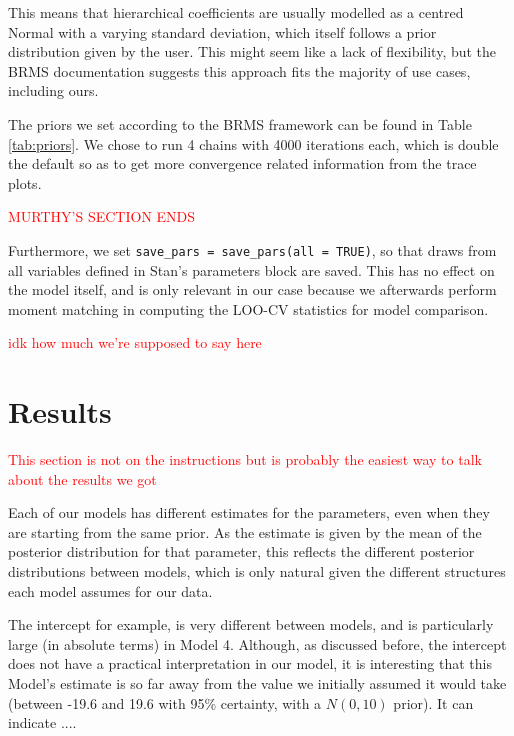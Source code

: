 \documentclass[12pt]{article}
\newcommand{\red}[1]{\textcolor{red}{#1}}
\begin{document}
This means that hierarchical coefficients are usually modelled as a centred Normal with a varying standard deviation, which itself follows a prior distribution given by the user. This might seem like a lack of flexibility, but the BRMS documentation suggests this approach fits the majority of use cases, including ours.

The priors we set according to the BRMS framework can be found in Table \ref{tab:priors}. We chose to run 4 chains with 4000 iterations each, which is double the default so as to get more convergence related information from the trace plots.


\red{MURTHY'S SECTION ENDS}





Furthermore, we set \texttt{save\_pars = save\_pars(all = TRUE)}, so that draws from all variables defined in Stan's parameters block are saved. This has no effect on the model itself, and is only relevant in our case because we afterwards perform moment matching in computing the LOO-CV statistics for model comparison.

\red{idk how much we're supposed to say here}



\section{Results}

\textcolor{red}{This section is not on the instructions but is probably the easiest way to talk about the results we got }


Each of our models has different estimates for the parameters, even when they are starting from the same prior.
As the estimate is given by the mean of the posterior distribution for that parameter, this reflects the different posterior distributions between models, which is only natural given the different structures each model assumes for our data.

The intercept for example, is very different between models, and is particularly large (in absolute terms) in Model 4. Although, as discussed before, the intercept does not have a practical interpretation in our model, it is interesting that this Model's estimate is so far away from the value we initially assumed it would take (between -19.6 and 19.6 with 95\% certainty, with a $N(0,10)$ prior). It can indicate ....
\end{document}
